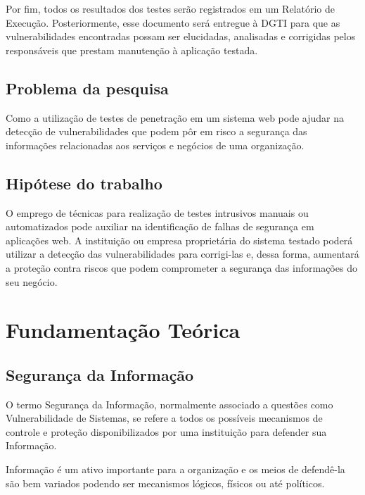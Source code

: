\documentclass[
    12pt,               %
    openright,          %
    oneside,            %
    a4paper,            %
    section=TITLE,     %
    english,            %
    french,             %
    spanish,            %
    brazil              %
    ]{abntex2}
\begin{document}
Por fim, todos os resultados dos testes serão registrados em um Relatório de Execução. Posteriormente, esse documento será entregue à DGTI para que as vulnerabilidades encontradas possam ser elucidadas, analisadas e corrigidas pelos responsáveis que prestam manutenção à aplicação testada.



\section{Problema da pesquisa}

Como a utilização de testes de penetração em um sistema web pode ajudar na detecção de vulnerabilidades que podem pôr em risco a segurança das informações relacionadas aos serviços e negócios de uma organização.



\section{Hipótese do trabalho}

O emprego de técnicas para realização de testes intrusivos manuais ou automatizados pode auxiliar na identificação de falhas de segurança em aplicações web. A instituição ou empresa proprietária do sistema testado poderá utilizar a detecção das vulnerabilidades para corrigi-las e, dessa forma, aumentará a proteção contra riscos que podem comprometer a segurança das informações do seu negócio.





\chapter{Fundamentação Teórica}


\section{Segurança da Informação}

O termo Segurança da Informação, normalmente associado a questões como Vulnerabilidade de Sistemas, se refere a todos os possíveis mecanismos de controle e proteção disponibilizados por uma instituição para defender sua Informação.


Informação é um ativo importante para a organização e os meios de defendê-la são bem variados podendo ser mecanismos lógicos, físicos ou até políticos.
\end{document}
